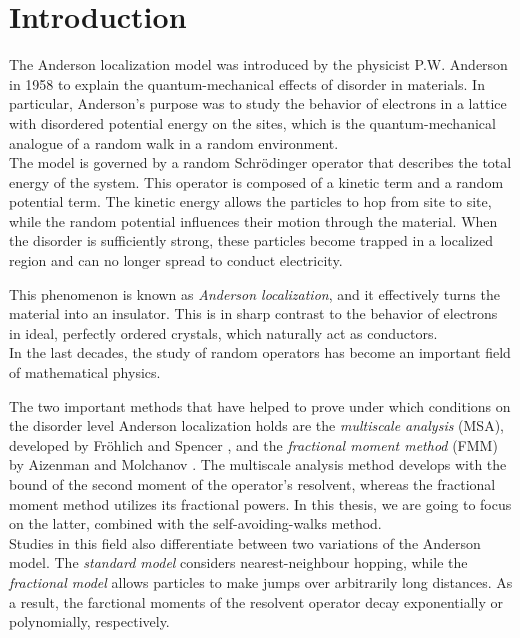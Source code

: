 \documentclass[11pt, a4paper, UKenglish, oneside]{book}
\theoremstyle{plain}
\theoremstyle{remark}
\theoremstyle{definition}
\numberwithin{equation}{section}
\numberwithin{theorem}{section}
\begin{document}
\clearpage
\tableofcontents
\newpage

\clearpage
{}
\chapter*{Introduction}

The Anderson localization model was introduced by the physicist P.W. Anderson in 1958 \cite{anderson1958} to explain the quantum-mechanical effects of disorder in materials.
In particular, Anderson's purpose was to study the behavior of electrons in a lattice with disordered potential energy on the sites, which is the quantum-mechanical analogue of a random walk in a random environment.\\

The model is governed by a random Schr\"odinger operator that describes the total energy of the system. This operator is composed of a kinetic term and a random potential term. The kinetic energy allows the particles to hop from site to site, while the random potential influences their motion through the material.
When the disorder is sufficiently strong, these particles become trapped in a localized region and can no longer spread to conduct electricity.

This phenomenon is known as \textit{Anderson localization}, and it effectively turns the material into an insulator.
This is in sharp contrast to the behavior of electrons in ideal, perfectly ordered crystals, which naturally act as conductors.\\

In the last decades, the study of random operators has become an important field of mathematical physics.

The two important methods that have helped to prove under which conditions on the disorder level Anderson localization holds are the \textit{multiscale analysis} (MSA), developed by Fr\"ohlich and Spencer \cite{frohlich1983}, and the 
\textit{ fractional moment method} (FMM) by Aizenman and Molchanov \cite{aizenman1993}. The multiscale analysis method develops with the bound of the second moment of the operator's resolvent, whereas the fractional moment method utilizes its fractional powers. In this thesis, we are going to focus on the latter, combined with the self-avoiding-walks method.\\

Studies in this field also differentiate between two variations of the Anderson model. The \textit{standard model} considers nearest-neighbour hopping, while the \textit{fractional model} allows particles to make jumps over arbitrarily long distances. As a result, the farctional moments of the resolvent operator decay exponentially or polynomially, respectively.\\
\end{document}
